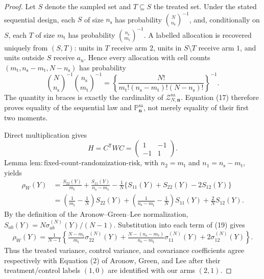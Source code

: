 \documentclass{article}
\begin{document}
\begin{proof}
Let \(S\) denote the sampled set and \(T\subseteq S\) the treated set.  Under the stated sequential design, each \(S\) of size \(n_{\mathrm s}\) has probability \(\binom N{n_{\mathrm s}}^{-1}\), and, conditionally on \(S\), each \(T\) of size \(m_{\mathrm t}\) has probability \(\binom{n_{\mathrm s}}{m_{\mathrm t}}^{-1}\).  A labelled allocation is recovered uniquely from \((S,T)\): units in \(T\) receive arm \(2\), units in \(S\setminus T\) receive arm \(1\), and units outside \(S\) receive \(a_{\mathrm u}\).  Hence every allocation with cell counts \((m_{\mathrm t},n_{\mathrm s}-m_{\mathrm t},N-n_{\mathrm s})\) has probability
\[
\binom N{n_{\mathrm s}}^{-1}\binom{n_{\mathrm s}}{m_{\mathrm t}}^{-1}
=\left\{\frac{N!}{m_{\mathrm t}!(n_{\mathrm s}-m_{\mathrm t})!(N-n_{\mathrm s})!}\right\}^{-1}. \tag{17}
\]
The quantity in braces is exactly the cardinality of \(\mathcal Z_{N,\mathbf n}^{\mathrm{sa}}\).  Equation (17) therefore proves equality of the sequential law and \(\mathbb P_{\mathbf n}^{\mathrm{sa}}\), not merely equality of their first two moments.

Direct multiplication gives
\[
H=C^{\mathsf T}WC=
\begin{pmatrix}1&-1\\-1&1\end{pmatrix}. \tag{18}
\]
Lemma \(\mathrm{lem{:}fixed\text{-}count\text{-}randomization\text{-}risk}\), with \(n_2=m_{\mathrm t}\) and \(n_1=n_{\mathrm s}-m_{\mathrm t}\), yields
\[
\begin{aligned}
\rho_W(Y)
&=\frac{S_{22}(Y)}{m_{\mathrm t}}
+\frac{S_{11}(Y)}{n_{\mathrm s}-m_{\mathrm t}}
-\frac1N\{S_{11}(Y)+S_{22}(Y)-2S_{12}(Y)\}\\
&=\left(\frac1{m_{\mathrm t}}-\frac1N\right)S_{22}(Y)
+\left(\frac1{n_{\mathrm s}-m_{\mathrm t}}-\frac1N\right)S_{11}(Y)
+\frac2N S_{12}(Y). \tag{19}
\end{aligned}
\]
By the definition of the Aronow--Green--Lee normalization,
\(S_{ab}(Y)=N\sigma_{ab}^{(N)}(Y)/(N-1)\).  Substitution into each term of (19) gives
\[
\begin{aligned}
\rho_W(Y)
=\frac1{N-1}\left\{
\frac{N-m_{\mathrm t}}{m_{\mathrm t}}\sigma_{22}^{(N)}(Y)
+\frac{N-(n_{\mathrm s}-m_{\mathrm t})}{n_{\mathrm s}-m_{\mathrm t}}\sigma_{11}^{(N)}(Y)
+2\sigma_{12}^{(N)}(Y)\right\}. \tag{20}
\end{aligned}
\]
Thus the treated variance, control variance, and covariance coefficients agree respectively with Equation (2) of Aronow, Green, and Lee after their treatment/control labels \((1,0)\) are identified with our arms \((2,1)\).


\end{proof}
\end{document}
